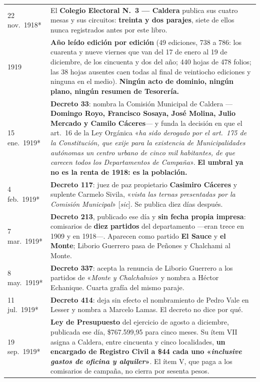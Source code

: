 \begin{longtable}{@{}p{2.7cm}p{10.3cm}@{}}
22 nov.\ 1918* & El \textbf{Colegio Electoral N.\ 3 --- Caldera} publica sus cuatro mesas y sus circuitos: \textbf{treinta y dos parajes}, siete de ellos nunca registrados antes por este libro. \\
1919 & \textbf{Año leído edición por edición} (49 ediciones, 738 a 786: los cuarenta y nueve viernes que van del 17 de enero al 19 de diciembre, de los cincuenta y dos del año; 440 hojas de 478 folios; las 38 hojas ausentes caen todas al final de veintiocho ediciones y ninguna en el medio). \textbf{Ningún acto de dominio, ningún plano, ningún resumen de Tesorería.} \\
15 ene.\ 1919* & \textbf{Decreto 33}: nombra la Comisión Municipal de Caldera ---\textbf{Domingo Royo, Francisco Sosaya, José Molina, Julio Mercado y Camilo Cáceres}--- y funda la decisión en que el art.\ 16 de la Ley Orgánica «\textit{ha sido derogado por el art.\ 175 de la Constitución, que exije para la existencia de Municipalidades autónomas un centro urbano de cinco mil habitantes, de que carecen todos los Departamentos de Campaña}». \textbf{El umbral ya no es la renta de 1918: es la población.} \\
4 feb.\ 1919* & \textbf{Decreto 117}: juez de paz propietario \textbf{Casimiro Cáceres} y suplente Carmelo Sivila, «\textit{vista las ternas presentadas por la Comisión Municipal}» [\textit{sic}]. Se publica diez días después. \\
7 mar.\ 1919* & \textbf{Decreto 213}, publicado ese día y \textbf{sin fecha propia impresa}: comisarios de \textbf{diez partidos} del departamento ---eran trece en 1909 y en 1918---. Aparecen como partido \textbf{El Sauce} y \textbf{el Monte}; Liborio Guerrero\index{Guerrero, Liborio} pasa de Peñones y Chalchami al Monte. \\
8 may.\ 1919* & \textbf{Decreto 337}: acepta la renuncia de Liborio Guerrero\index{Guerrero, Liborio} a los partidos de «\textit{Monte y Chalchalnio}» y nombra a Héctor Echanique. Cuarta grafía del mismo paraje. \\
11 jul.\ 1919* & \textbf{Decreto 414}: deja sin efecto el nombramiento de Pedro Vale en Lesser y nombra a Marcelo Lamas. El decreto no dice por qué. \\
19 sep.\ 1919* & \textbf{Ley de Presupuesto} del ejercicio de agosto a diciembre, publicada ese día, \$767.599,95 para cinco meses. Su ítem VII asigna a Caldera, entre cincuenta y cinco localidades, \textbf{un encargado de Registro Civil a \$44 cada uno «\textit{inclusive gastos de oficina y alquiler}»}. El ítem V, que paga a los comisarios de campaña, no cierra por sesenta pesos. \\

\end{longtable}
